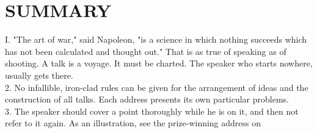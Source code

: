 \documentclass[10pt]{article}
\begin{document}
\section*{SUMMARY}
I. "The art of war," said Napoleon, "is a science in which nothing succeeds which has not been calculated and thought out." That is as true of speaking as of shooting. A talk is a voyage. It must be charted. The speaker who starts nowhere, usually gets there.\\
2. No infallible, iron-clad rules can be given for the arrangement of ideas and the construction of all talks. Each address presents its own particular problems.\\
3. The speaker should cover a point thoroughly while he is on it, and then not refer to it again. As an illustration, see the prize-winning address on
\end{document}

